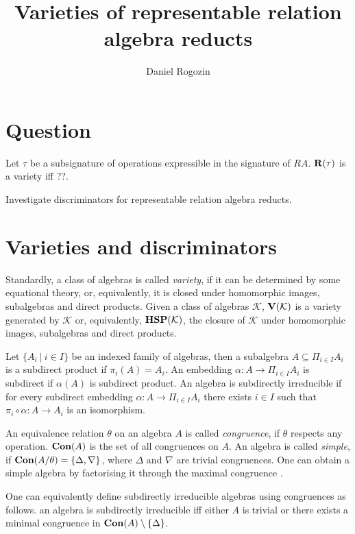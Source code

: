 \documentclass[a4paper]{article}
\author{Daniel Rogozin}
\date{}
\title{Varieties of representable relation algebra reducts}
\theoremstyle{defin}
\theoremstyle{theorem}
\theoremstyle{claim}
\theoremstyle{prop}
\theoremstyle{lemma}
\theoremstyle{fact}
\theoremstyle{ex}
\theoremstyle{col}
\begin{document}
\maketitle

\nocite{*}

\section{Question}

Let $\tau$ be a subsignature of operations expressible in the signature of $RA$. ${\bf R}(\tau)$ is a variety iff ??.

Investigate discriminators for representable relation algebra reducts.

\section{Varieties and discriminators}

Standardly, a class of algebras is called \emph{variety}, if it can be determined by some equational theory, or, equivalently, it is closed under homomorphic images, subalgebras and direct products. Given a class of algebras $\mathcal{K}$, ${\bf V}(\mathcal{K})$ is a variety generated by $\mathcal{K}$ or, equivalently, ${\bf HSP}(\mathcal{K})$, the closure of $\mathcal{K}$ under homomorphic images, subalgebras and direct products.

Let $\{ A_i \: | \: i \in I \}$ be an indexed family of algebras, then a subalgebra $A \subseteq \Pi_{i \in I} A_i$ is a subdirect product if $\pi_i(A) = A_i$. An embedding $\alpha : A \to \Pi_{i \in I} A_i$ is subdirect if $\alpha(A)$ is subdirect product. An algebra is subdirectly irreducible if for every subdirect embedding $\alpha : A \to \Pi_{i \in I} A_i$ there exists $i \in I$ such that $\pi_i \circ \alpha : A \to A_i$ is an isomorphism.

An equivalence relation $\theta$ on an algebra $A$ is called \emph{congruence}, if $\theta$ respects any operation. ${\bf Con}(A)$ is the set of all congruences on $A$. An algebra is called \emph{simple}, if ${\bf Con}(A/\theta) = \{ \Delta, \nabla \}$, where $\Delta$ and $\nabla$ are trivial congruences. One can obtain a simple algebra by factorising it through the maximal congruence \cite[Theorem 8]{sankappanavar1981course}.

One can equivalently define subdirectly irreducible algebras using congruences as follows. an algebra is subdirectly irreducible iff either $A$ is trivial or there exists a minimal congruence in ${\bf Con}(A) \setminus \{ \Delta \}$.
\end{document}
